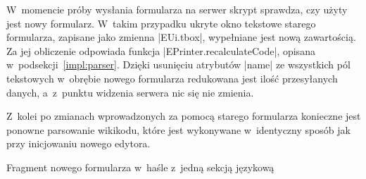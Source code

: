 
W~momencie próby wysłania formularza na serwer skrypt sprawdza, czy użyty jest nowy formularz. W~takim przypadku ukryte okno tekstowe starego formularza, zapisane jako zmienna \kod|EUi.tbox|, wypełniane jest nową zawartością. Za jej obliczenie odpowiada funkcja \kod|EPrinter.recalculateCode|, opisana w~podsekcji~\ref{impl:parser}. Dzięki usunięciu atrybutów \kod|name| ze wszystkich pól tekstowych w~obrębie nowego formularza redukowana jest ilość przesyłanych danych, a~z~punktu widzenia serwera nic się nie zmienia.

Z~kolei po zmianach wprowadzonych za pomocą starego formularza konieczne jest ponowne parsowanie wikikodu, które jest wykonywane w~identyczny sposób jak przy inicjowaniu nowego edytora.

\begin{illustration}
	\caption{Fragment nowego formularza w~haśle z~jedną sekcją językową}
	\label{fig:newform}
\end{illustration}

